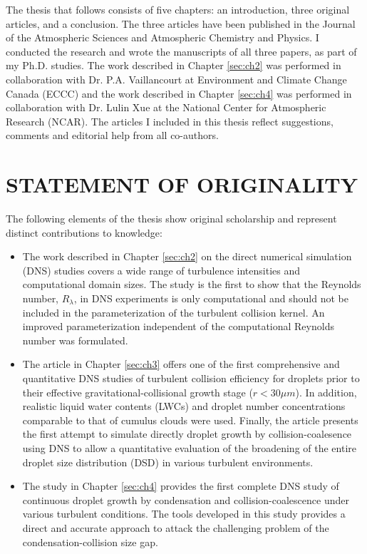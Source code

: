 \documentclass [12pt,letterpaper]{report}
\begin{document}
The thesis that follows consists of five chapters: an introduction, three original articles, and a conclusion. The three articles have been published in the Journal of the Atmospheric Sciences and Atmospheric Chemistry and Physics. I conducted the research and wrote the manuscripts of all three papers, as part of my Ph.D. studies. The work described in Chapter \ref{sec:ch2} was performed in collaboration with Dr. P.A. Vaillancourt at Environment and Climate Change Canada (ECCC) and the work described in Chapter \ref{sec:ch4} was performed in collaboration with Dr. Lulin Xue at the National Center for Atmospheric Research (NCAR). The articles I included in this thesis reflect suggestions, comments and editorial help from all co-authors.


\newpage
\section*{\centering STATEMENT OF ORIGINALITY}

The following elements of the thesis show original scholarship and represent distinct contributions to knowledge:

\begin{itemize}
\item The work described in Chapter \ref{sec:ch2} on the direct numerical simulation (DNS) studies covers a wide range of turbulence intensities and computational domain sizes. The study is the first to show that the Reynolds number, $R_\lambda$, in DNS experiments is only computational and should not be included in the parameterization of the turbulent collision kernel. An improved parameterization independent of the computational Reynolds number was formulated.

\item The article in Chapter \ref{sec:ch3} offers one of the first comprehensive and quantitative DNS studies of turbulent collision efficiency for droplets prior to their effective gravitational-collisional growth stage ($r<30 \mu m$). In addition, realistic liquid water contents (LWCs) and droplet number concentrations comparable to that of cumulus clouds were used. Finally, the article presents the first attempt to simulate directly droplet growth by collision-coalesence using DNS to allow a quantitative evaluation of the broadening of the entire droplet size distribution (DSD) in various turbulent environments.

\item The study in Chapter \ref{sec:ch4} provides the first complete DNS study of continuous droplet growth by condensation and collision-coalescence under various turbulent conditions. The tools developed in this study provides a direct and accurate approach to attack the challenging problem of the condensation-collision size gap. 

\end{itemize}
\end{document}
